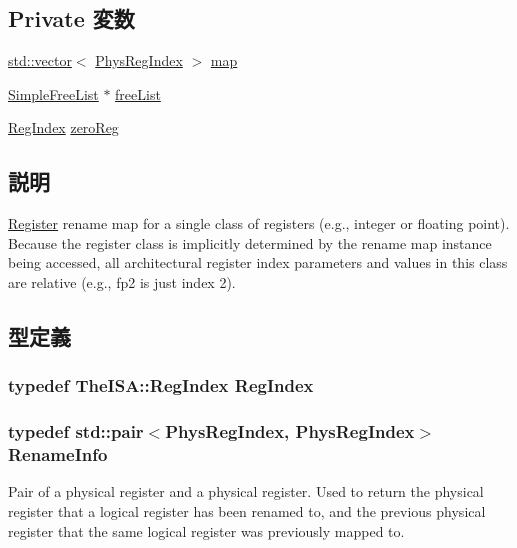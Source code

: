\subsection*{Private 変数}
\begin{DoxyCompactItemize}
\item 
\hyperlink{classstd_1_1vector}{std::vector}$<$ \hyperlink{o3_2comm_8hh_a5ec29599c4bc29a3054c451674969e7b}{PhysRegIndex} $>$ \hyperlink{classSimpleRenameMap_a20955fcac3b8535e6b1237aa7ba0cccf}{map}
\item 
\hyperlink{classSimpleFreeList}{SimpleFreeList} $\ast$ \hyperlink{classSimpleRenameMap_a5d2c433781e53552fb56d17e81d4b6bd}{freeList}
\item 
\hyperlink{classSimpleRenameMap_a36d25e03e43fa3bb4c5482cbefe5e0fb}{RegIndex} \hyperlink{classSimpleRenameMap_a13b7cf8d0c4baf190d7e75e372c74d86}{zeroReg}
\end{DoxyCompactItemize}


\subsection{説明}
\hyperlink{classRegister}{Register} rename map for a single class of registers (e.g., integer or floating point). Because the register class is implicitly determined by the rename map instance being accessed, all architectural register index parameters and values in this class are relative (e.g., fp2 is just index 2). 

\subsection{型定義}
\hypertarget{classSimpleRenameMap_a36d25e03e43fa3bb4c5482cbefe5e0fb}{
\subsubsection[{RegIndex}]{\setlength{\rightskip}{0pt plus 5cm}typedef TheISA::RegIndex {\bf RegIndex}}}
\label{classSimpleRenameMap_a36d25e03e43fa3bb4c5482cbefe5e0fb}
\hypertarget{classSimpleRenameMap_a3dc3673767d81356dfb2000480aed47b}{
\subsubsection[{RenameInfo}]{\setlength{\rightskip}{0pt plus 5cm}typedef {\bf std::pair}$<${\bf PhysRegIndex}, {\bf PhysRegIndex}$>$ {\bf RenameInfo}}}
\label{classSimpleRenameMap_a3dc3673767d81356dfb2000480aed47b}
Pair of a physical register and a physical register. Used to return the physical register that a logical register has been renamed to, and the previous physical register that the same logical register was previously mapped to. 

